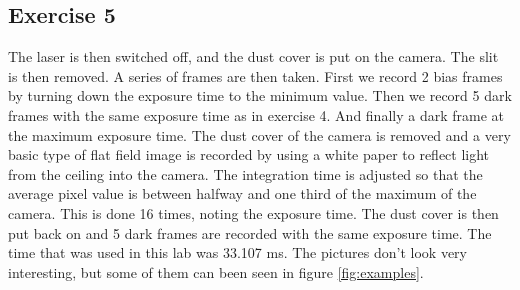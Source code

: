 \documentclass[a4paper,12pt]{article}
\begin{document}
\subsection{Exercise 5}
The laser is then switched off, and the dust cover is put on the camera. The slit is then removed. A series of frames are then taken.
First we record 2 bias frames by turning down the exposure time to the minimum
value. Then we record 5 dark frames with the same exposure time as in exercise 4. And finally a dark frame at the maximum exposure time.
The dust cover of the camera is removed and a very basic type of flat field image is recorded by using a white paper to reflect light from the ceiling into the camera.
The integration time is adjusted so that the average pixel value is between halfway and one third of the maximum of the camera. This is done 16 times, noting the exposure time.
The dust cover is then put back on and 5 dark frames are recorded with the same exposure time.
The time that was used in this lab was 33.107 ms.
The pictures don't look very interesting, but some of them can been seen in figure \ref{fig:examples}.
\end{document}
